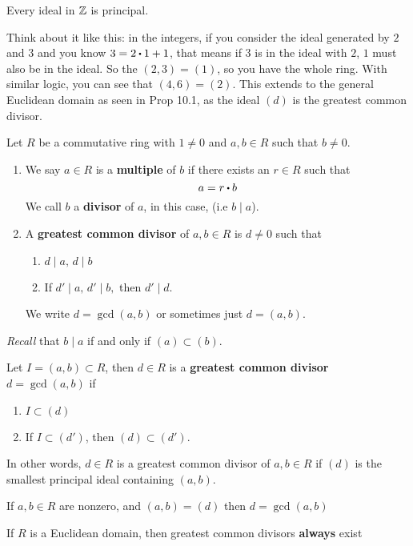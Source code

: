 \documentclass[../Main.tex]{subfiles}
\begin{document}
\begin{crl}[title= Ideals in $\Z$ are principal]
	Every ideal in $\Z$ is principal.
\end{crl}
Think about it like this: in the integers, if you consider the ideal generated by $2$ and $3$ and you know $3=2\rdot 1+1$, that means if $3$ is in the ideal with $2$, $1$ must also be in the ideal. So the $(2,3)=(1)$, so you have the whole ring. With similar logic, you can see that $(4,6)=(2)$. This extends to the general Euclidean domain as seen in Prop 10.1, as the ideal $(d)$ is the greatest common divisor.
\begin{dfn}[title = {Multiple, Divisor, GCD}]
	Let $R$ be a commutative ring with $1\ne 0$ and $a,b\in R$ such that $b\ne 0$.
	\begin{enumerate}[label=(\arabic*)]
		\item We say $a\in R$ is a \textbf{multiple} of $b$ if there exists an $r\in R$ such that
		\[a=r\rdot b\]
		We call $b$ a \textbf{divisor} of $a$, in this case, (i.e $b\mid a$).
		\item A \textbf{greatest common divisor} of $a,b\in R$ is $d\ne 0$ such that
		\begin{enumerate}[label=(\roman*)]
			\item $d\mid a, \, d\mid b$
			\item If $d'\mid a,\,  d'\mid b,$ then $d'\mid d$.
		\end{enumerate}
		We write $d=\gcd(a,b)$ or sometimes just $d=(a,b)$.
	\end{enumerate}
\end{dfn}
\textit{Recall} that $b\mid a$ if and only if $(a)\subset (b)$.
\begin{dfn}[title = Ideal GCD]
	Let $I = (a,b)\subset R$, then $d\in R$ is a \textbf{greatest common divisor} $d=\gcd(a,b)$ if
	\begin{enumerate}
		\item $I\subset (d)$
		\item If $I\subset (d')$, then $(d)\subset (d')$.
	\end{enumerate}
	In other words, $d\in R$ is a greatest common divisor of $a,b\in R$ if $(d)$ is the smallest principal ideal containing $(a,b)$.
\end{dfn}
\begin{prop}
	If $a,b\in R$ are nonzero, and $(a,b)=(d)$ then $d=\gcd(a,b)$
\end{prop}	
\begin{thm}[title = GCDs exist in Euclidean domains]
	If $R$ is a Euclidean domain, then greatest common divisors \textbf{always} exist
\end{thm}
\end{document}
